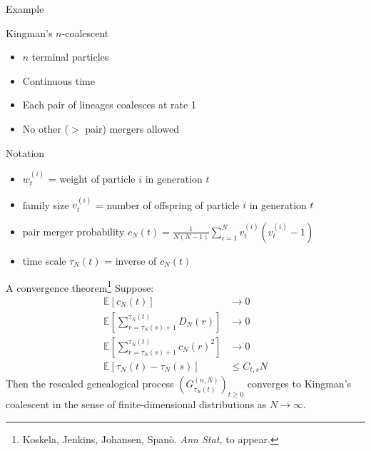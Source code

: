 \documentclass[aspectratio=169]{beamer}
\theoremstyle{definition}
\newcommand{\E}{\mathbb{E}}
\newcommand{\vt}[2][t]{v_{#1}^{(#2)}}
\newcommand{\wt}[2][t]{w_{#1}^{(#2)}}
\begin{document}
\begin{frame}{Example}
\centering
{}
\end{frame}

\begin{frame}{Kingman's $n$-coalescent}
\begin{itemize}
\pause
\item $n$ terminal particles
\item Continuous time
\item Each pair of lineages coalesces at rate 1
\item No other ($>$ pair) mergers allowed
\end{itemize}
\end{frame}

\begin{frame}{Notation}
\begin{itemize}
\item $\wt{i}$ = weight of particle $i$ in generation $t$
\item family size $\vt{i}$ = number of offspring of particle $i$ in generation $t$
\pause
\item pair merger probability $c_N(t) = \frac{1}{N(N-1)}\sum_{i=1}^N \vt{i}(\vt{i}-1)$
\pause
\item time scale $\tau_N(t)$ = inverse of $c_N(t)$
\end{itemize}
\end{frame}

\begin{frame}{A convergence theorem\footnote{Koskela, Jenkins, Johansen, Span\`o. \textit{Ann Stat,} to appear.}}
\vspace{-10pt}
Suppose:
\begin{align*}
\E [c_N(t)] &\rightarrow 0  \\
\E \left[ \sum_{ r = \tau_N( s ) + 1 }^{ \tau_N( t ) } D_N( r ) \right] &\rightarrow 0 \\
\E \left[ \sum_{ r = \tau_N( s ) + 1 }^{ \tau_N( t ) } c_N( r )^2 \right] &\rightarrow 0 \\
\E [\tau_N(t) - \tau_N(s)] &\leq C_{t,s} N 
\end{align*}
Then the rescaled genealogical process $(G_{\tau_N(t)}^{(n,N)})_{t\geq0} $ converges to Kingman's coalescent in the sense of finite-dimensional distributions as $N\to\infty$.
\end{frame}
\end{document}
